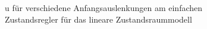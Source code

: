 \begin{figure}[H]
    \centering
    \caption[u für einfachen Zustandsregler (linear)]{u für verschiedene Anfangsauslenkungen am einfachen Zustandsregler für das lineare Zustandsraummodell}
    \label{fig:Bild16}
\end{figure}

